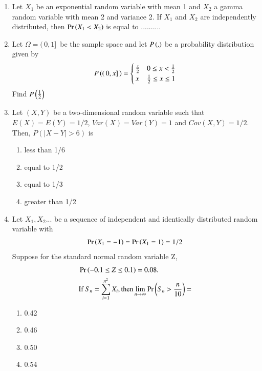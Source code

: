 \documentclass[journal,12pt,twocolumn]{IEEEtran}
\begin{document}
\begin{enumerate}
\solution
  
%
\item Let $X_{1}$ be	an	exponential	random	variable with mean 1 and $X_{2}$ a gamma	random variable	with mean 2	and	variance 2.	If $X_{1}$ and $X_{2}$ are independently	distributed, then $\Pr\left(X_1 < X_2\right)$ is equal	to ..........	
\\
\solution
  
%
\item Let $\Omega = (\,0,1]\,$ be the sample space and let $P\left(.\right)$ be a probability distribution given by\\
\begin{align}
P\left((\,0,x]\,\right) = 
\begin{cases}
   \frac{x}{2} & 0 \le x < \frac{1}{2}\\
   x & \frac{1}{2} \le x \le 1
\end{cases}
\end{align}
Find $P\left(\frac{1}{2}\right)$
\\
\solution
  
%
\item Let $(X,Y)$ be a two-dimensional random variable such that $E(X)=E(Y)=1/2$, $Var(X)=Var(Y)=1$ and $Cov(X,Y)=1/2$.
Then, $P(|X-Y|>6)$ is
\begin{enumerate}

    \item less than 1/6
    \item equal to 1/2
    \item equal to 1/3
    \item greater than 1/2

\end{enumerate}
\solution
  

\item Let \(X_1,X_2\)... be a sequence of independent and identically distributed random variable with
\begin{align}
    \Pr\left(X_1=-1\right)=\Pr\left(X_1=1\right)=1/2
\end{align}
Suppose for the standard normal random variable Z,
\begin{align}
&\Pr\left(-0.1\leq Z \leq 0.1\right)=0.08 .\label{qneq} \\ \nonumber
&\text{If } S_n= \sum_{i=1}^{n^2} X_i ,\text{then} \lim_{n\to\infty} \Pr\left(S_n >\frac{n}{10}\right) =
\end{align}
\begin{enumerate}
    \item 0.42
    \item 0.46
    \item 0.50
    \item 0.54
\end{enumerate}
\solution
  


\end{enumerate}
\end{document}
